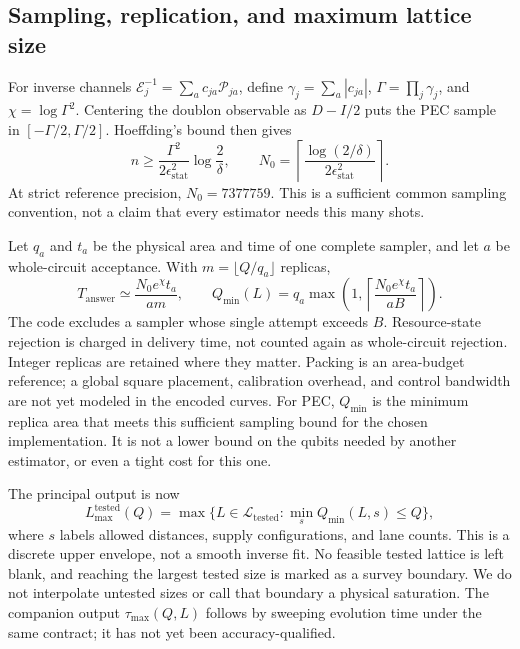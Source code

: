 \documentclass[11pt]{article}
\newcommand{\eps}{\epsilon}
\begin{document}
\subsection{Sampling, replication, and maximum lattice size}
For inverse channels $\mathcal E_j^{-1}=\sum_a c_{ja}\mathcal P_{ja}$,
define $\gamma_j=\sum_a|c_{ja}|$, $\Gamma=\prod_j\gamma_j$, and
$\chi=\log\Gamma^2$. Centering the doublon observable as $D-I/2$ puts
the PEC sample in $[-\Gamma/2,\Gamma/2]$. Hoeffding's bound then gives
\begin{equation}\label{eq:shots}
 n\geq\frac{\Gamma^2}{2\eps_{\mathrm{stat}}^2}\log\frac{2}{\delta},
 \qquad N_0=\left\lceil\frac{\log(2/\delta)}{2\eps_{\mathrm{stat}}^2}\right\rceil.
\end{equation}
At strict reference precision, $N_0=7377759$. This is a sufficient common
sampling convention, not a claim that every estimator needs this many shots.

Let $q_a$ and $t_a$ be the physical area and time of one complete sampler,
and let $a$ be whole-circuit acceptance. With $m=\lfloor Q/q_a\rfloor$ replicas,
\begin{equation}\label{eq:time}
 T_{\mathrm{answer}}\simeq\frac{N_0e^\chi t_a}{am},\qquad
 Q_{\min}(L)=q_a\max\!\left(1,
 \left\lceil\frac{N_0e^\chi t_a}{aB}\right\rceil\right).
\end{equation}
The code excludes a sampler whose single attempt exceeds $B$. Resource-state
rejection is charged in delivery time, not counted again as whole-circuit
rejection. Integer replicas are retained where they matter. Packing is an
area-budget reference; a global square placement, calibration overhead, and
control bandwidth are not yet modeled in the encoded curves.
For PEC, $Q_{\min}$ is the minimum replica area that meets this sufficient
sampling bound for the chosen implementation. It is not a lower bound on
the qubits needed by another estimator, or even a tight cost for this one.

The principal output is now
\begin{equation}\label{eq:lmax}
 L_{\max}^{\mathrm{tested}}(Q)=
 \max\{L\in\mathcal L_{\mathrm{tested}}:\min_s Q_{\min}(L,s)\leq Q\},
\end{equation}
where $s$ labels allowed distances, supply configurations, and lane counts.
This is a discrete upper envelope, not a smooth inverse fit. No feasible
tested lattice is left blank, and reaching the largest tested size is marked
as a survey boundary. We do not interpolate untested sizes or call that
boundary a physical saturation. The companion output
$\tau_{\max}(Q,L)$ follows by sweeping evolution time under the same contract;
it has not yet been accuracy-qualified.
\end{document}
